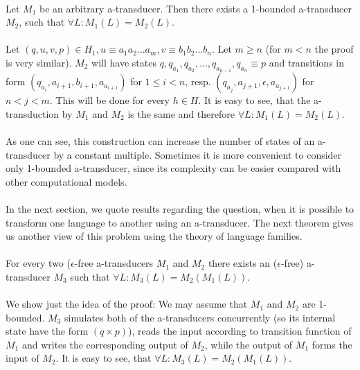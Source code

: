 \paragraph{}
\clema Let $M_{1}$ be an arbitrary a-transducer. Then there exists a 1-bounded a-transducer $M_{2}$, such that $\forall L: M_{1}(L) = M_{2}(L)$.

\paragraph{}
\dokaz Let $(q, u, v, p) \in H_{1}, u \equiv a_{1}a_{2}...a_{m}, v \equiv b_{1}b_{2}...b_{n}$. Let $m\geq n$ (for $m < n$ the proof is very similar). $M_{2}$ will have states $q, q_{a_{1}}, q_{a_{2}}, ..., q_{a_{n-1}}, q_{a_{n}} \equiv p$ and transitions in form $(q_{a_{i}}, a_{i+1}, b_{i+1}, a_{a_{i+1}})$ for $1 \leq i<n$, resp. $(q_{a_{j}}, a_{j+1}, \epsilon, a_{a_{j+1}})$ for $n < j < m$. This will be done for every $h \in H$. It is easy to see, that the a-transduction by $M_{1}$ and $M_{2}$ is the same and therefore $\forall L: M_{1}(L) = M_{2}(L)$. \square

\paragraph{}
As one can see, this construction can increase the number of states of an a-transducer by a constant multiple. Sometimes it is more convenient to consider only 1-bounded a-transducer, since its complexity can be easier compared with other computational models.

\paragraph{}
In the next section, we quote results regarding the question, when it is possible to transform one language to another using an a-transducer. The next theorem gives us another view of this problem using the theory of language families.

\paragraph{}
\clema For every two ($\epsilon $-free a-transducers $M_{1}$ and $M_{2}$ there exists an ($\epsilon $-free) a-transducer $M_{3}$ such that $\forall L: M_{3}(L) = M_{2}(M_{1}(L))$.

\paragraph{}
\dokaz We show just the idea of the proof: We may assume that $M_{1}$ and $M_{2}$ are 1-bounded. $M_{3}$ simulates both of the a-transducers concurrently (so its internal state have the form $(q \times p)$), reads the input according to transition function of $M_{1}$ and writes the corresponding output of $M_{2}$, while the output of $M_{1}$ forms the input of $M_{2}$. It is easy to see, that $\forall L: M_{3}(L) = M_{2}(M_{1}(L))$. \square

